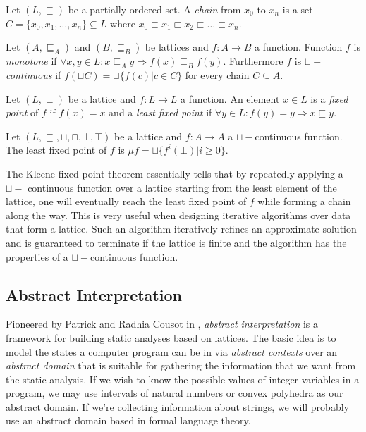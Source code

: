 \begin{defn}
Let $(L, \sqsubseteq)$ be a partially ordered set. A \emph{chain} from $x_0$ to $x_n$ is a set $C = \{x_0, x_1, \dots, x_n\} \subseteq L$ where $x_0 \sqsubset x_1 \sqsubset x_2 \sqsubset \dots \sqsubset x_n$. 
\end{defn}

\begin{defn}
Let $(A, \sqsubseteq_A)$ and $(B, \sqsubseteq_B)$ be lattices and $f: A \rightarrow B$ a function. Function $f$ is \emph{monotone} if $\forall x, y \in L: x \sqsubseteq_A y \Rightarrow f(x) \sqsubseteq_B f(y)$. Furthermore $f$ is \emph{$\sqcup-$continuous} if $f(\sqcup C) = \sqcup\{f(c) | c \in C\}$ for every chain $C \subseteq A$.
\end{defn}

\begin{defn}
Let $(L, \sqsubseteq)$ be a lattice and $f: L \rightarrow L$ a function. An element $x \in L$ is a \emph{fixed point} of $f$ if $f(x) = x$ and a \emph{least fixed point} if $\forall y \in L: f(y) = y \Rightarrow x \sqsubseteq y$.
\end{defn}

\begin{thm}
Let $(L, \sqsubseteq, \sqcup, \sqcap, \bot, \top)$ be a lattice and $f: A \rightarrow A$ a $\sqcup-$continuous function. The least fixed point of $f$ is $\mu f = \sqcup\{f^i(\bot)|i \geq 0\}$.
\end{thm}

The Kleene fixed point theorem essentially tells that by repeatedly applying a $\sqcup-$ continuous function over a lattice starting from the least element of the lattice, one will eventually reach the least fixed point of $f$ while forming a chain along the way. This is very useful when designing iterative algorithms over data that form a lattice. Such an algorithm iteratively refines an approximate solution and is guaranteed to terminate if the lattice is finite and the algorithm has the properties of a $\sqcup-$continuous function.

\subsection{Abstract Interpretation}
Pioneered by Patrick and Radhia Cousot in \cite{Cousot77}, \emph{abstract interpretation} is a framework for building static analyses based on lattices. The basic idea is to model the states a computer program can be in via \emph{abstract contexts} over an \emph{abstract domain} that is suitable for gathering the information that we want from the static analysis. If we wish to know the possible values of integer variables in a program, we may use intervals of natural numbers or convex polyhedra as our abstract domain. If we're collecting information about strings, we will probably use an abstract domain based in formal language theory.

